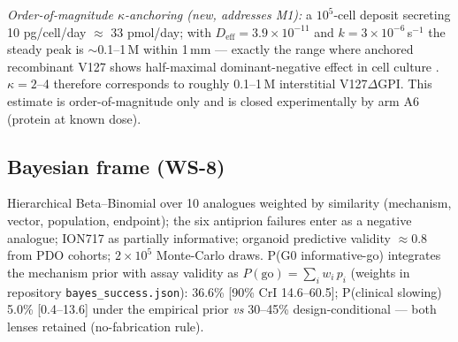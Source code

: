 \documentclass[10pt,twocolumn]{article}
\begin{document}
\emph{Order-of-magnitude $\kappa$-anchoring (new, addresses M1):} a $10^5$-cell deposit secreting 10 pg/cell/day $\approx$ 33 pmol/day; with $D_{\text{eff}}=3.9\times10^{-11}$ and $k=3\times10^{-6}$\,s$^{-1}$ the steady peak is $\sim$0.1--1\,\textmu M within 1\,mm --- exactly the range where anchored recombinant V127 shows half-maximal dominant-negative effect in cell culture \citep{gatdula2026}. $\kappa=2$--4 therefore corresponds to roughly 0.1--1\,\textmu M interstitial V127$\Delta$GPI. This estimate is order-of-magnitude only and is closed experimentally by arm A6 (protein at known dose).

\subsection{Bayesian frame (WS-8)}
Hierarchical Beta--Binomial over 10 analogues weighted by similarity (mechanism, vector, population, endpoint); the six antiprion failures enter as a negative analogue; ION717 as partially informative; organoid predictive validity $\approx$0.8 from PDO cohorts; $2\times10^5$ Monte-Carlo draws. P(G0 informative-go) integrates the mechanism prior with assay validity as $P(\text{go})=\sum_i w_i\,p_i$ (weights in repository \texttt{bayes\_success.json}): 36.6\% [90\% CrI 14.6--60.5]; P(clinical slowing) 5.0\% [0.4--13.6] under the empirical prior \emph{vs} 30--45\% design-conditional --- both lenses retained (no-fabrication rule).
\end{document}
